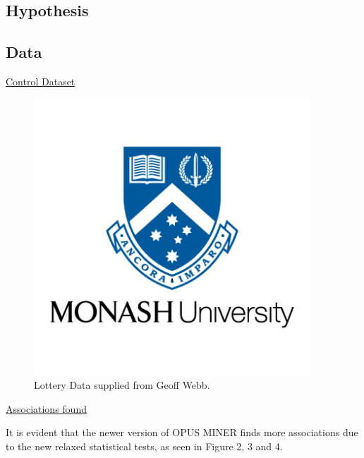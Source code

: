 \documentclass[10pt,a4paper]{article}
\begin{document}
\subsection{Hypothesis}

\subsection{Data}

\vspace{0.5cm}

\underline{Control Dataset}
\vspace{0.3cm}


\begin{figure}[h!]
\begin{center}
  \includegraphics[width=28em]{monash-university-logo.png}
\end{center}
  \caption{Lottery Data supplied from Geoff Webb.}
  \label{fig:SSPresults1}
\end{figure}



\pagebreak

\vspace{2cm}
\underline{Associations found}
\vspace{0.3cm}
\begin{addmargin}[3em]{1em}
It is evident that the newer version of OPUS MINER finds more associations due to the new relaxed statistical tests, as seen in Figure 2, 3 and 4.
\end{addmargin}

\vspace{1cm}
\end{document}
